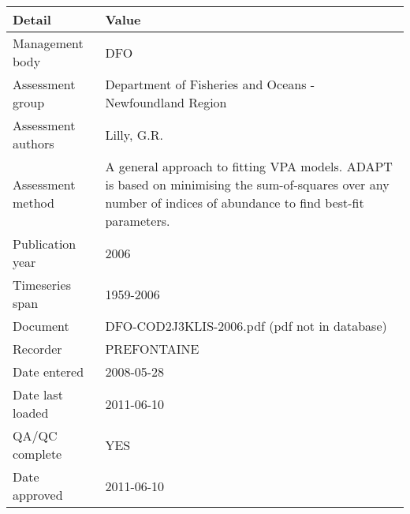 \begin{table}[htb]
\centering
\begin{tabular}{lp{7cm}}
\toprule
Detail & Value \\
\midrule
Management body    & DFO                                                                                                                                                            \\
Assessment group   & Department of Fisheries and Oceans - Newfoundland Region                                                                                                       \\
Assessment authors & Lilly, G.R.                                                                                                                                                    \\
Assessment method  & A general approach to fitting VPA models. ADAPT is based on minimising the sum-of-squares over any number of indices of abundance to find best-fit parameters. \\
Publication year   & 2006                                                                                                                                                           \\
Timeseries span    & 1959-2006                                                                                                                                                      \\
Document           & DFO-COD2J3KLIS-2006.pdf (pdf not in database)                                                                                                                  \\
Recorder           & PREFONTAINE                                                                                                                                                    \\
Date entered       & 2008-05-28                                                                                                                                                     \\
Date last loaded   & 2011-06-10                                                                                                                                                     \\
QA/QC complete     & YES                                                                                                                                                            \\
Date approved      & 2011-06-10                                                                                                                                                     \\
\bottomrule
\end{tabular}
\label{tab:assessdet}
\end{table}
